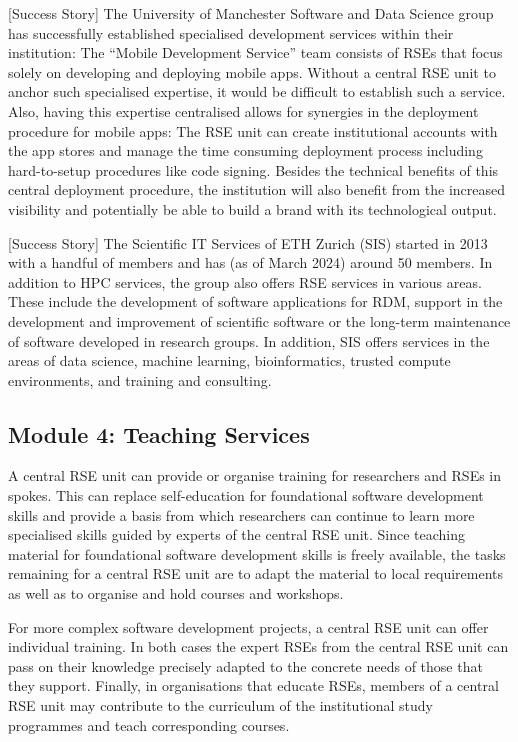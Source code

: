 \documentclass[a4paper]{article}
\begin{document}
[Success Story]
The University of Manchester Software and Data Science group has successfully established specialised development services within their institution:
The “Mobile Development Service” \autocite{manchester_mobile} team consists of RSEs that focus solely on developing and deploying mobile apps.
Without a central RSE unit to anchor such specialised expertise, it would be difficult to establish such a service.
Also, having this expertise centralised allows for synergies in the deployment procedure for mobile apps:
The RSE unit can create institutional accounts with the app stores and manage the time consuming deployment process including hard-to-setup procedures like code signing.
Besides the technical benefits of this central deployment procedure, the institution will also benefit from the increased visibility and potentially be able to build a brand with its technological output.

[Success Story]
The Scientific IT Services of ETH Zurich (SIS) started in 2013 with a handful of members and has (as of March 2024) around 50 members.
In addition to HPC services, the group also offers RSE services in various areas.
These include the development of software applications for RDM, support in the development and improvement of scientific software or the long-term maintenance of software developed in research groups.
In addition, SIS offers services in the areas of data science, machine learning, bioinformatics, trusted compute environments, and training and consulting.

\subsection{Module 4: Teaching Services}%
\label{sec:teaching}

A central RSE unit can provide or organise training for researchers and RSEs in spokes.
This can replace self-education for foundational software development skills and provide a basis from which researchers can continue to learn more specialised skills guided by experts of the central RSE unit.
Since teaching material for foundational software development skills is freely available,
the tasks remaining for a central RSE unit are to adapt the material to local requirements as well as to organise and hold courses and workshops.

For more complex software development projects, a central RSE unit can offer individual training.
In both cases the expert RSEs from the central RSE unit can pass on their knowledge precisely adapted to the concrete needs of those that they support.
Finally, in organisations that educate RSEs, members of a central RSE unit may contribute to the curriculum of the institutional study programmes and teach corresponding courses. 
\end{document}
